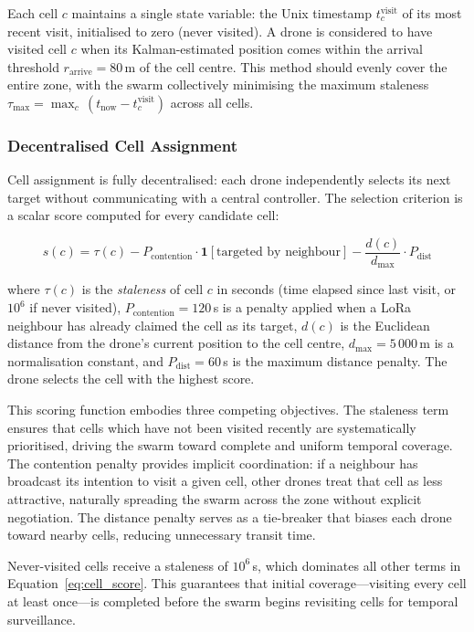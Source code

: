 Each cell $c$ maintains a single state variable: the Unix timestamp $t_c^{\text{visit}}$ of its most recent visit, initialised to zero (never visited). A drone is considered to have visited cell $c$ when its Kalman-estimated position comes within the arrival threshold $r_{\text{arrive}} = 80$\,m of the cell centre. This method should evenly cover the entire zone, with the swarm collectively minimising the maximum staleness $\tau_{\max} = \max_{c}\, (t_{\text{now}} - t_c^{\text{visit}})$ across all cells. 

\subsubsection{Decentralised Cell Assignment}

Cell assignment is fully decentralised: each drone independently selects its next target without communicating with a central controller. The selection criterion is a scalar score computed for every candidate cell:

\begin{equation}
    s(c) = \tau(c) - P_{\text{contention}} \cdot \mathbf{1}[\text{targeted by neighbour}] - \frac{d(c)}{d_{\max}} \cdot P_{\text{dist}}
    \label{eq:cell_score}
\end{equation}

where $\tau(c)$ is the \emph{staleness} of cell $c$ in seconds (time elapsed since last visit, or $10^6$ if never visited), $P_{\text{contention}} = 120$\,s is a penalty applied when a LoRa neighbour has already claimed the cell as its target, $d(c)$ is the Euclidean distance from the drone's current position to the cell centre, $d_{\max} = 5\,000$\,m is a normalisation constant, and $P_{\text{dist}} = 60$\,s is the maximum distance penalty. The drone selects the cell with the highest score.

This scoring function embodies three competing objectives. The staleness term ensures that cells which have not been visited recently are systematically prioritised, driving the swarm toward complete and uniform temporal coverage. The contention penalty provides implicit coordination: if a neighbour has broadcast its intention to visit a given cell, other drones treat that cell as less attractive, naturally spreading the swarm across the zone without explicit negotiation. The distance penalty serves as a tie-breaker that biases each drone toward nearby cells, reducing unnecessary transit time.

Never-visited cells receive a staleness of $10^6$\,s, which dominates all other terms in Equation~\eqref{eq:cell_score}. This guarantees that initial coverage---visiting every cell at least once---is completed before the swarm begins revisiting cells for temporal surveillance.

